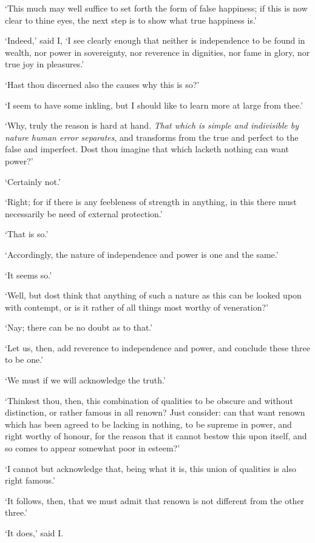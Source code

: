 \documentclass[11pt]{book}
\begin{document}
`This much may well suffice to set forth the form of false happiness; if
this is now clear to thine eyes, the next step is to show what true
happiness is.'

`Indeed,' said I, `I see clearly enough that neither is independence to
be found in wealth, nor power in sov\-er\-eign\-ty, nor reverence in
dignities, nor fame in glory, nor true joy in pleasures.'

`Hast thou discerned also the causes why this is so?'

`I seem to have some inkling, but I should like to learn more at large
from thee.'

`Why, truly the reason is hard at hand. \emph{That which is simple and indivisible by nature human error separates}, and transforms from the
true and perfect to the false and imperfect. Dost thou imagine that
which lacketh nothing can want power?'

`Certainly not.'

`Right; for if there is any feebleness of strength in anything, in this
there must necessarily be need of external protection.'

`That is so.'

`Accordingly, the nature of independence and power is one and the same.'

`It seems so.'

`Well, but dost think that anything of such a nature as this can be
looked upon with contempt, or is it rather of all things most worthy of
veneration?'

`Nay; there can be no doubt as to that.'

`Let us, then, add reverence to independence and pow\-er, and conclude
these three to be one.'

`We must if we will acknowledge the truth.'

`Thinkest thou, then, this combination of qualities to be obscure and
without distinction, or rather famous in all renown? Just consider: can
that want renown which has been agreed to be lacking in nothing, to be
supreme in power, and right worthy of honour, for the reason that it
cannot bestow this upon itself, and so comes to appear somewhat poor in
esteem?'

`I cannot but acknowledge that, being what it is, this union of
qualities is also right famous.'

`It follows, then, that we must admit that renown is not different from
the other three.'

`It does,' said I.
\end{document}
